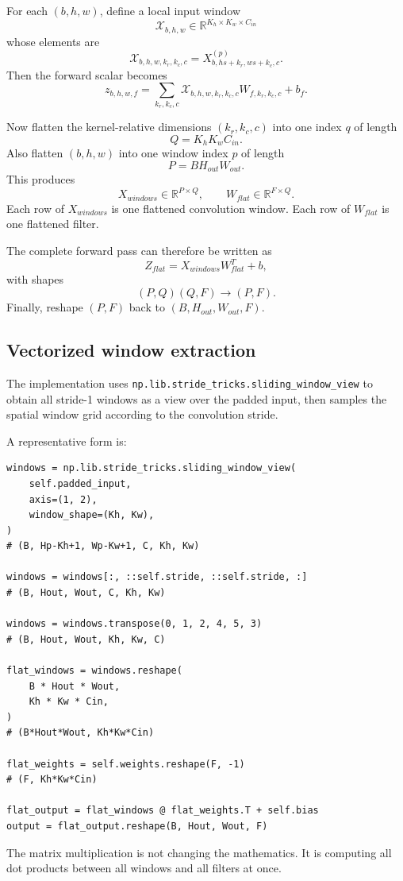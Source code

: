 \documentclass[11pt,a4paper]{article}
\newcommand{\R}{\mathbb{R}}
\newcommand{\code}[1]{\texttt{#1}}
\begin{document}
For each $(b,h,w)$, define a local input window
\[
\mathcal{X}_{b,h,w}\in\R^{K_h\times K_w\times C_{in}}
\]
whose elements are
\[
\mathcal{X}_{b,h,w,k_r,k_c,c}
=
X^{(p)}_{b,hs+k_r,ws+k_c,c}.
\]
Then the forward scalar becomes
\[
z_{b,h,w,f}
=
\sum_{k_r,k_c,c}
\mathcal{X}_{b,h,w,k_r,k_c,c}
W_{f,k_r,k_c,c}+b_f.
\]

Now flatten the kernel-relative dimensions $(k_r,k_c,c)$ into one index $q$ of length
\[
Q=K_hK_wC_{in}.
\]
Also flatten $(b,h,w)$ into one window index $p$ of length
\[
P=BH_{out}W_{out}.
\]
This produces
\[
X_{windows}\in\R^{P\times Q},
\qquad
W_{flat}\in\R^{F\times Q}.
\]
Each row of $X_{windows}$ is one flattened convolution window. Each row of $W_{flat}$ is one flattened filter.

The complete forward pass can therefore be written as
\[
Z_{flat}=X_{windows}W_{flat}^T+b,
\]
with shapes
\[
(P,Q)(Q,F)\rightarrow(P,F).
\]
Finally, reshape $(P,F)$ back to $(B,H_{out},W_{out},F)$.

\subsection{Vectorized window extraction}

The implementation uses \code{np.lib.stride\_tricks.sliding\_window\_view} to obtain all stride-1 windows as a view over the padded input, then samples the spatial window grid according to the convolution stride.

A representative form is:
\begin{lstlisting}
windows = np.lib.stride_tricks.sliding_window_view(
    self.padded_input,
    axis=(1, 2),
    window_shape=(Kh, Kw),
)
# (B, Hp-Kh+1, Wp-Kw+1, C, Kh, Kw)

windows = windows[:, ::self.stride, ::self.stride, :]
# (B, Hout, Wout, C, Kh, Kw)

windows = windows.transpose(0, 1, 2, 4, 5, 3)
# (B, Hout, Wout, Kh, Kw, C)

flat_windows = windows.reshape(
    B * Hout * Wout,
    Kh * Kw * Cin,
)
# (B*Hout*Wout, Kh*Kw*Cin)

flat_weights = self.weights.reshape(F, -1)
# (F, Kh*Kw*Cin)

flat_output = flat_windows @ flat_weights.T + self.bias
output = flat_output.reshape(B, Hout, Wout, F)
\end{lstlisting}

The matrix multiplication is not changing the mathematics. It is computing all dot products between all windows and all filters at once.
\end{document}
